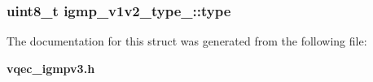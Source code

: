 \subsubsection{\setlength{\rightskip}{0pt plus 5cm}uint8\_\-t \bf{igmp\_\-v1v2\_\-type\_\-::type}}\label{structigmp__v1v2__type___b707fe5f364901cac468171756eecac0}




The documentation for this struct was generated from the following file:\begin{CompactItemize}
\item 
\bf{vqec\_\-igmpv3.h}\end{CompactItemize}
